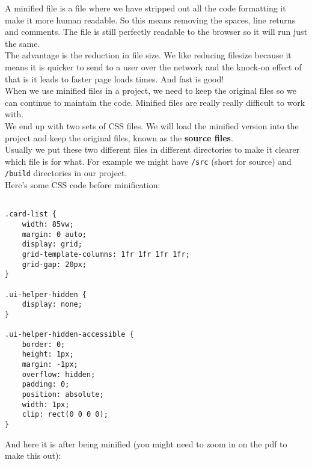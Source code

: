 A minified file is a file where we have stripped out all the code formatting it make it more human readable. So this means removing the spaces, line returns and comments. The file is still perfectly readable to the browser so it will run just the same.
\\

The advantage is the reduction in file size. We like reducing filesize because it means it is quicker to send to a user over the network and the knock-on effect of that is it leads to faster page loads times. And fast is good!
\\

When we use minified files in a project, we need to keep the original files so we can continue to maintain the code. Minified files are really really difficult to work with.
\\

We end up with two sets of CSS files. We will load the minified version into the project and keep the original files, known as the \textbf{source files}. 
\\

Usually we put these two different files in different directories to make it clearer which file is for what. For example we might have \texttt{/src} (short for source) and \texttt{/build} directories in our project.
\\ 


Here's some CSS code before minification:
\\

	\begin{verbatim}

.card-list { 
    width: 85vw; 
    margin: 0 auto; 
    display: grid; 
    grid-template-columns: 1fr 1fr 1fr 1fr; 
    grid-gap: 20px; 
} 
  
.ui-helper-hidden { 
    display: none; 
} 
  
.ui-helper-hidden-accessible { 
    border: 0; 
    height: 1px; 
    margin: -1px; 
    overflow: hidden; 
    padding: 0; 
    position: absolute; 
    width: 1px; 
    clip: rect(0 0 0 0); 
} 

	\end{verbatim}

And here it is after being minified (you might need to zoom in on the pdf to make this out):
\\




